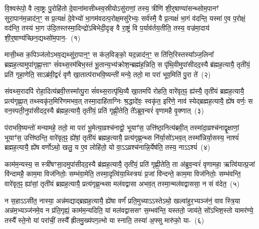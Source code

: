 \setcounter{anuvakam}{0}
वि॒श्वरू॑पो॒ वै त्वा॒ष्ट्रः पु॒रोहि॑तो दे॒वाना॑मासीथ्स्व॒स्रीयो\-ऽसु॑राणां॒ तस्य॒ त्रीणि॑ शी॒र्॒\mbox{}षाण्या॑सन्थ्सोम॒पानꣳ॑ सुरा॒पान॑म॒न्नाद॑न॒ꣳ॒ स प्र॒त्यक्षं॑ दे॒वेभ्यो॑ भा॒गम॑वदत्प॒रोक्ष॒मसु॑रेभ्यः॒ सर्व॑स्मै॒ वै प्र॒त्यक्षं॑ भा॒गं व॑दन्ति॒ यस्मा॑ ए॒व प॒रोक्षं॒ वद॑न्ति॒ तस्य॑ भा॒ग उ॑दि॒तस्तस्मा॒दिन्द्रो॑\-ऽबिभेदी॒दृङ् वै रा॒ष्ट्रं वि प॒र्याव॑र्तय॒तीति॒ तस्य॒ वज्र॑मा॒दाय॑ शी॒र्॒\mbox{}षाण्य॑च्छिन॒द्यथ्सो॑म॒पान॒-~(१)\ip

मासी॒थ्स क॒पिञ्ज॑लो\-ऽभव॒द्यथ्सु॑रा॒पान॒ꣳ॒ स क॑ल॒विङ्को॒ यद॒न्नाद॑न॒ꣳ॒ स ति॑त्ति॒रिस्तस्या᳚\-ञ्ज॒लिना᳚ ब्रह्म\-ह॒त्यामुपा॑गृह्णा॒त्ताꣳ सं॑वथ्स॒रम॑बिभ॒स्तं भू॒तान्य॒भ्य॑क्रोश॒न्ब्रह्म॑ह॒न्निति॒ स पृ॑थि॒वीमुपा॑सीद\-द॒स्यै ब्र॑ह्मह॒त्यायै॒ तृती॑यं॒ प्रति॑ गृहा॒णेति॒ सा\-ऽब्र॑वी॒द्वरं॑ वृणै खा॒तात्प॑रा\-भवि॒ष्यन्ती॑ मन्ये॒ ततो॒ मा परा॑ भूव॒मिति॑ पु॒रा ते॑~(२)\ip

संवथ्स॒रादपि॑ रोहा॒दित्य॑ब्रवी॒त्तस्मा᳚त्पु॒रा सं॑वथ्स॒रात्पृ॑थि॒व्यै खा॒तमपि॑ रोहति॒ वारे॑वृत॒ꣴ॒ ह्य॑स्यै॒ तृती॑यं ब्रह्मह॒त्यायै॒ प्रत्य॑\-गृह्णा॒त् तथ्स्वकृ॑त॒मिरि॑णमभव॒त् तस्मा॒दाहि॑ताग्निः श्र॒द्धादे॑वः॒ स्वकृ॑त॒ इरि॑णे॒ नाव॑ स्येद्ब्रह्मह॒त्यायै॒ ह्ये॑ष वर्णः॒ स वन॒स्पती॒नुपा॑सीदद॒स्यै ब्र॑ह्मह॒त्यायै॒ तृती॑यं॒ प्रति॑ गृह्णी॒तेति॒ ते᳚\-ऽब्रुव॒न्वरं॑ वृणामहै वृ॒क्णात्~(३)\ip

प॑राभवि॒ष्यन्तो॑ मन्यामहे॒ ततो॒ मा परा॑ भू॒मेत्या॒व्रश्च॑नाद्वो॒ भूयाꣳ॑स॒ उत्ति॑ष्ठा॒नित्य॑ब्रवी॒त् तस्मा॑दा॒व्रश्च॑नाद्वृ॒क्षाणां॒ भूयाꣳ॑स॒ उत्ति॑ष्ठन्ति॒ वारे॑वृत॒ꣴ॒ ह्ये॑षां॒ तृती॑यं ब्रह्मह॒त्यायै॒ प्रत्य॑\-गृह्ण॒न्थ्स नि॑र्या॒सो॑\-ऽभव॒त् तस्मा᳚न्निर्या॒सस्य॒ नाश्यं॑ ब्रह्मह॒त्यायै॒ ह्ये॑ष वर्णो\-ऽथो॒ खलु॒ य ए॒व लोहि॑तो॒ यो वा॒\-ऽऽ\-व्रश्च॑नान्नि॒र्येष॑ति॒ तस्य॒ ना\-ऽऽ\-श्यं॑~(४)\ip

काम॑म॒न्यस्य॒ स स्त्री॑षꣳसा॒दमुपा॑सीदद॒स्यै ब्र॑ह्मह॒त्यायै॒ तृती॑यं॒ प्रति॑ गृह्णी॒तेति॒ ता अ॑ब्रुव॒न्वरं॑ वृणामहा॒ ऋत्वि॑यात्प्र॒जां वि॑न्दामहै॒ काम॒मा विज॑नितोः॒ सम्भ॑वा॒मेति॒ तस्मा॒दृत्वि॑या॒थ्स्त्रियः॑ प्र॒जां वि॑न्दन्ते॒ काम॒मा विज॑नितोः॒ सम्भ॑वन्ति॒ वारे॑वृत॒ꣴ॒ ह्या॑सां॒ तृती॑यं ब्रह्मह॒त्यायै॒ प्रत्य॑\-गृह्ण॒न्थ्सा मल॑वद्वासा अभव॒त् तस्मा॒न्मल॑वद्वाससा॒ न सं व॑देत॒~(५)\ip

न स॒हा\-ऽऽ\-सी॑त॒ नास्या॒ अन्न॑मद्याद्ब्रह्मह॒त्यायै॒ ह्ये॑षा वर्णं॑ प्रति॒मुच्या\-ऽऽ\-स्ते\-ऽथो॒ खल्वा॑हुर॒भ्यञ्ज॑नं॒ वाव स्त्रि॒या अन्न॑म॒भ्यञ्ज॑नमे॒व न प्र॑ति॒गृह्यं॒ काम॑म॒न्यदिति॒ यां मल॑वद्वाससꣳ स॒म्भव॑न्ति॒ यस्ततो॒ जाय॑ते॒ सो॑\-ऽभिश॒स्तो यामर॑ण्ये॒ तस्यै᳚ स्ते॒नो यां परा॑चीं॒ तस्यै᳚ ह्रीतमु॒ख्य॑पग॒ल्भो या स्नाति॒ तस्या॑ अ॒फ्सु मारु॑को॒ या-~(६)\ip

